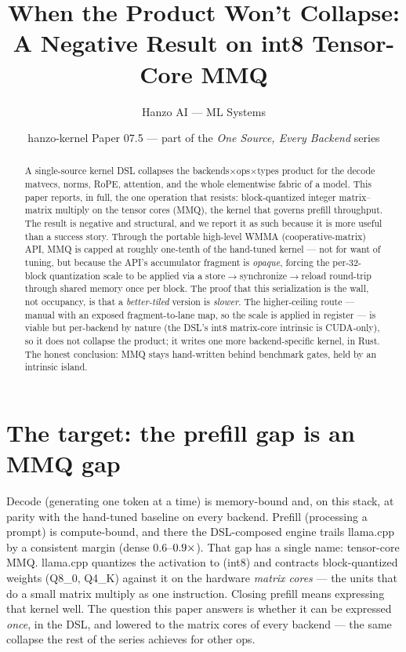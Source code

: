 \documentclass[11pt]{article}
\title{\textbf{When the Product Won't Collapse:\\ A Negative Result on int8 Tensor-Core MMQ}}
\author{Hanzo AI --- ML Systems}
\date{hanzo-kernel Paper 07.5 --- part of the \emph{One Source, Every Backend} series}
\begin{document}
\maketitle

\begin{abstract}
A single-source kernel DSL collapses the backends$\times$ops$\times$types product for the decode matvecs,
norms, RoPE, attention, and the whole elementwise fabric of a model. This paper reports, in full, the one
operation that resists: block-quantized integer matrix--matrix multiply on the tensor cores (MMQ), the
kernel that governs prefill throughput. The result is negative and structural, and we report it as such
because it is more useful than a success story. Through the portable high-level WMMA (cooperative-matrix)
API, MMQ is capped at roughly one-tenth of the hand-tuned kernel --- not for want of tuning, but because
the API's accumulator fragment is \emph{opaque}, forcing the per-32-block quantization scale to be applied
via a store$\to$synchronize$\to$reload round-trip through shared memory once per block. The proof that
this serialization is the wall, not occupancy, is that a \emph{better-tiled} version is \emph{slower}. The
higher-ceiling route --- manual  with an exposed fragment-to-lane map, so the scale is
applied in register --- is viable but per-backend by nature (the DSL's int8 matrix-core intrinsic is
CUDA-only), so it does not collapse the product; it writes one more backend-specific kernel, in Rust.
The honest conclusion: MMQ stays hand-written behind benchmark gates, held by an intrinsic island.
\end{abstract}

\section{The target: the prefill gap is an MMQ gap}
\label{sec:target}

Decode (generating one token at a time) is memory-bound and, on this stack, at parity with the hand-tuned
baseline on every backend. Prefill (processing a prompt) is compute-bound, and there the DSL-composed
engine trails llama.cpp by a consistent margin (dense $0.6$--$0.9\times$). That gap has a single name:
tensor-core MMQ. llama.cpp quantizes the activation to  (int8) and contracts block-quantized
weights (Q8\_0, Q4\_K) against it on the hardware \emph{matrix cores} --- the units that do a small
matrix multiply as one instruction. Closing prefill means expressing that kernel well. The question this
paper answers is whether it can be expressed \emph{once}, in the DSL, and lowered to the matrix cores of
every backend --- the same collapse the rest of the series achieves for other ops.
\end{document}

